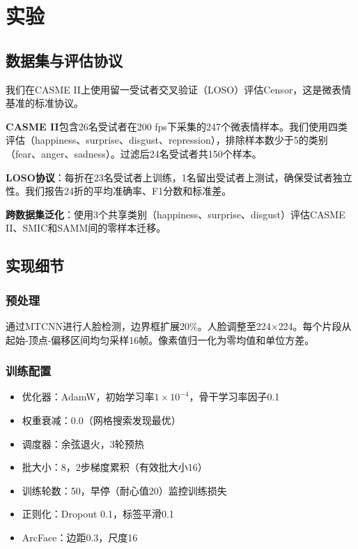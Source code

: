 
\section{实验}

\subsection{数据集与评估协议}

我们在CASME II\cite{yan2014casme2}上使用留一受试者交叉验证（LOSO）评估Censor，这是微表情基准的标准协议。

\textbf{CASME II}包含26名受试者在200 fps下采集的247个微表情样本。我们使用四类评估（happiness、surprise、disgust、repression），排除样本数少于5的类别（fear、anger、sadness）。过滤后24名受试者共150个样本。

\textbf{LOSO协议}：每折在23名受试者上训练，1名留出受试者上测试，确保受试者独立性。我们报告24折的平均准确率、F1分数和标准差。

\textbf{跨数据集泛化}：使用3个共享类别（happiness、surprise、disgust）评估CASME II、SMIC\cite{li2013smic}和SAMM\cite{yap2018samm}间的零样本迁移。

\subsection{实现细节}

\subsubsection{预处理}

通过MTCNN进行人脸检测，边界框扩展20\%。人脸调整至224$\times$224。每个片段从起始-顶点-偏移区间均匀采样16帧。像素值归一化为零均值和单位方差。

\subsubsection{训练配置}

\begin{itemize}
\item 优化器：AdamW，初始学习率$1 \times 10^{-4}$，骨干学习率因子0.1
\item 权重衰减：0.0（网格搜索发现最优）
\item 调度器：余弦退火，3轮预热
\item 批大小：8，2步梯度累积（有效批大小16）
\item 训练轮数：50，早停（耐心值20）监控训练损失
\item 正则化：Dropout 0.1，标签平滑0.1
\item ArcFace：边距0.3，尺度16
\end{itemize}

